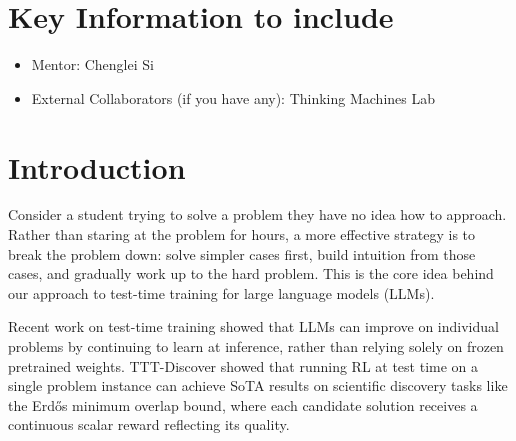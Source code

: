 \documentclass{article}
\begin{document}
\section{Key Information to include}
\begin{itemize}
    \item Mentor: Chenglei Si
    \item External Collaborators (if you have any): Thinking Machines Lab
\end{itemize}


\section{Introduction}
Consider a student trying to solve a problem they have no idea how to approach. Rather than staring at the problem for hours, a more effective strategy is to break the problem down: solve simpler cases first, build intuition from those cases, and gradually work up to the hard problem. This is the core idea behind our approach to test-time training for large language models (LLMs). 
 
Recent work on test-time training showed that LLMs can improve on individual problems by continuing to learn at inference, rather than relying solely on frozen pretrained weights. TTT-Discover \cite{tttdiscover} showed that running RL at test time on a single problem instance can achieve SoTA results on scientific discovery tasks like the Erd\H{o}s minimum overlap bound, where each candidate solution receives a continuous scalar reward reflecting its quality.
 
\end{document}
